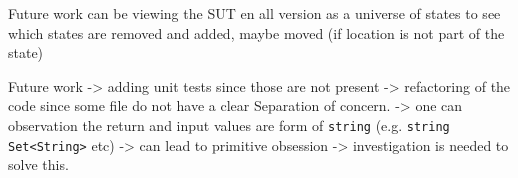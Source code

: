         Future work can be viewing the SUT en all version as a universe of states to see which states are removed and added, maybe moved (if location is not part of the state)
        
        Future work -> adding unit tests since those are not present -> refactoring of the code since some file do not have a clear Separation of concern. -> one can observation the return and input values are form of \verb|string| (e.g. \verb|string| \verb|Set<String>| etc) -> can lead to primitive obsession -> investigation is needed to solve this. 
